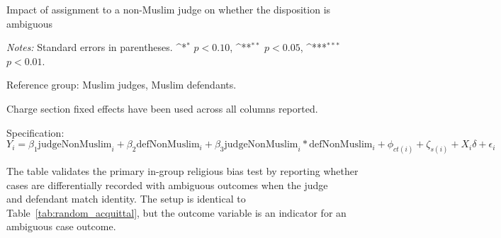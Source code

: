 \documentclass[12pt,english]{article}
\def\sym#1{\ifmmode^{#1}\else\(^{#1}\)\fi}
\newcommand{\HOME}{\string~}
\newcommand{\curpath}{\HOME/ddl/justice-overleaf}
\newcommand{\curpath}{.}
\begin{document}
\begin{appendices}
\begin{landscape}
\begin{table}[h!]
  \begin{center}
     \caption{Impact of assignment to a non-Muslim judge on whether the disposition is ambiguous}
      \label{tab:robust_amb_muslim}
     
    \end{center}
    \begin{minipage}{1.6\textwidth}
        \footnotesize 
        \emph{Notes:} Standard errors in parentheses. \sym{*} \(p<0.10\), \sym{**} \(p<0.05\), \sym{***} \(p<0.01\).  \par 
        Reference group: Muslim judges, Muslim defendants.  \par
        Charge section fixed effects have been used across all columns reported. \par
        Specification: $Y_{i} = \beta_{1} \text{judgeNonMuslim}_{i} + \beta_{2} \text{defNonMuslim}_{i} + \beta_{3} \text{judgeNonMuslim}_{i} * \text{defNonMuslim}_{i} + \phi_{ct(i)} + \zeta_{s(i)} + X_i \delta + \epsilon_{i}$  \par
        The table validates the primary in-group religious bias test by reporting whether cases are differentially recorded with ambiguous outcomes when the judge \\ and defendant match identity. The setup is identical to Table~\ref{tab:random_acquittal}, but the outcome variable is an indicator for an ambiguous case outcome.
   \end{minipage}
\end{table}



\end{landscape}
\end{appendices}
\end{document}

